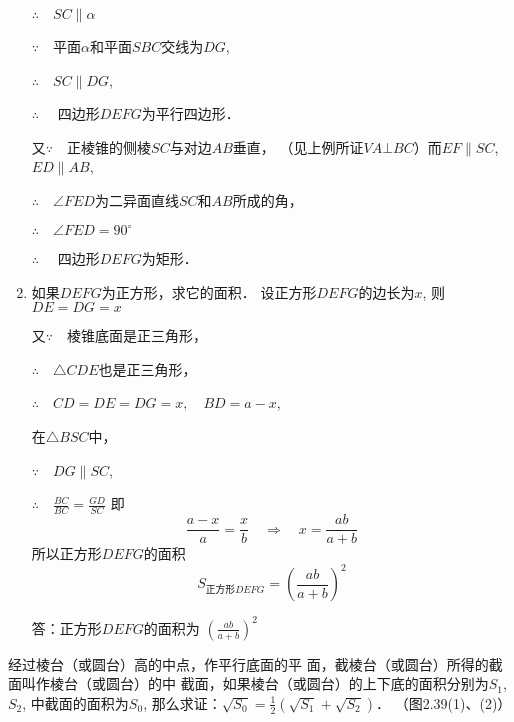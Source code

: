 \begin{solution}
\begin{enumerate}
$\therefore\quad SC\parallel \alpha$

$\because\quad $平面$\alpha$和平面$SBC$交线为$DG$,

$\therefore\quad SC\parallel DG$,

$\therefore\quad$ 四边形$DEFG$为平行四边形．

又$\because\quad $正棱锥的侧棱$SC$与对边$AB$垂直，
（见上例所证$VA\bot BC$）而$EF\parallel SC$, $ED\parallel AB$,

$\therefore\quad \angle FED$为二异面直线$SC$和$AB$所成的角，

$\therefore\quad \angle FED=90^{\circ}$

$\therefore\quad $ 四边形$DEFG$为矩形．

\item 如果$DEFG$为正方形，求它的面积．
设正方形$DEFG$的边长为$x$, 则
$DE=DG=x$

又$\because\quad $棱锥底面是正三角形，

$\therefore\quad \triangle  CDE$也是正三角形，

$\therefore\quad CD=DE=DG=x,\quad BD=a-x$,

在$\triangle BSC$中，

$\because\quad DG\parallel SC$,

$\therefore\quad \frac{BC}{BC}=\frac{GD}{SC}$
即
\[\frac{a-x}{a}=\frac{x}{b}\quad \Rightarrow\quad x=\frac{ab}{a+b}\]
所以正方形$DEFG$的面积
\[S_{\text{正方形}DEFG}=\left(\frac{ab}{a+b}\right)^2\]

答：正方形$DEFG$的面积为
$\left(\frac{ab}{a+b}\right)^2$
\end{enumerate}
\end{solution}

\begin{example}
    经过棱台（或圆台）高的中点，作平行底面的平
面，截棱台（或圆台）所得的截面叫作棱台（或圆台）的中
截面，如果棱台（或圆台）的上下底的面积分别为$S_1$, $S_2$,
中截面的面积为$S_0$, 那么求证：$\sqrt{S_0}=\frac{1}{2}\left(\sqrt{S_1}+\sqrt{S_2}\right)$．
（图2.39(1)、(2)）
\end{example}

